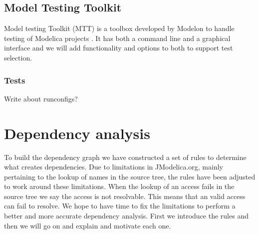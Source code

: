 \documentclass{cslthse-msc}
\begin{document}

\section{Model Testing Toolkit}
Model testing Toolkit (MTT) is a toolbox developed by Modelon to handle testing of Modelica projects \cite{modelon.comMTT}. It has both a command line and a graphical interface and we will add functionality and options to both to support test selection.

\subsection{Tests}
    Write about runconfigs?

\chapter[Dependency analysis]{Dependency analysis}
To build the dependency graph we have constructed a set of rules to determine what creates dependencies. Due to limitations in JModelica.org, mainly pertaining to the lookup of names in the source tree, the rules have been adjusted to work around these limitations. When the lookup of an access fails in the source tree we say the access is not resolvable. This means that an valid access can fail to resolve. We hope to have time to fix the limitations to perform a better and more accurate dependency analysis. First we introduce the rules and then we will go on and explain and motivate each one.
\end{document}
